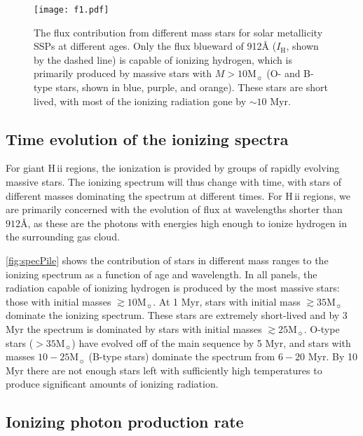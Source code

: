 \documentclass[trackchanges, twocolumn, tighten]{aastex61}
\newcommand{\Fig}[1]{\autoref{fig:#1}}
\newcommand\Msun{\ensuremath{\mathrm{M_{\sun}}}}
\newcommand{\hii}{H\,{\sc ii}\xspace}
\newcommand{\ang}{\ensuremath{\mbox{\AA}}}
\begin{document}
\begin{figure}[Ht!]
  \begin{center}
    \texttt{[image: f1.pdf]}
    \caption{The flux contribution from different mass stars for solar metallicity SSPs at different ages. Only the flux blueward of 912\ang{} ($I_{\mathrm{H}}$, shown by the dashed line) is capable of ionizing hydrogen, which is primarily produced by massive stars with $M > 10\Msun$  (O- and B-type stars, shown in blue, purple, and orange). These stars are short lived, with most of the ionizing radiation gone by $\sim 10$ Myr.}
    \label{fig:specPile}
  \end{center}
\end{figure}


\subsection{Time evolution of the ionizing spectra}\label{sec:spectra:age}

For giant \hii regions, the ionization is provided by groups of rapidly evolving massive stars. The ionizing spectrum will thus change with time, with stars of different masses dominating the spectrum at different times. For \hii regions, we are primarily concerned with the evolution of flux at wavelengths shorter than $912 \ang$, as these are the photons with energies high enough to ionize hydrogen in the surrounding gas cloud. 

\Fig{specPile} shows the contribution of stars in different mass ranges to the ionizing spectrum as a function of age and wavelength. In all panels, the radiation capable of ionizing hydrogen is produced by the most massive stars: those with initial masses $\gtrsim 10 \Msun$. At 1 Myr, stars with initial mass $\gtrsim35\Msun$ dominate the ionizing spectrum. These stars are extremely short-lived and by 3 Myr the spectrum is dominated by stars with initial masses $\gtrsim25\Msun$. O-type stars ($>35\Msun$) have evolved off of the main sequence by 5 Myr, and stars with masses $10-25\Msun$ (B-type stars) dominate the spectrum from $6-20$ Myr. By 10 Myr there are not enough stars left with sufficiently high temperatures to produce significant amounts of ionizing radiation.

\subsection{Ionizing photon production rate}\label{sec:spectra:Q}
\end{document}
